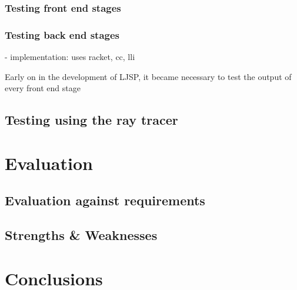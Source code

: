 \documentclass[11pt]{report}
\begin{document}
\subsection{Testing front end stages}
\subsection{Testing back end stages}



- implementation: uses racket, cc, lli




Early on in the development of LJSP, it became necessary to test the output of every front end stage 
\section{Testing using the ray tracer}


\chapter{Evaluation}
\section{Evaluation against requirements}
\section{Strengths \& Weaknesses}

\chapter{Conclusions}
\end{document}
